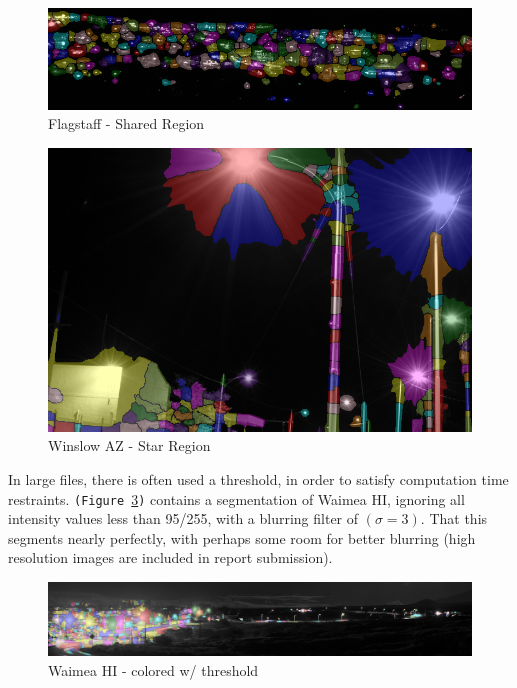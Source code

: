 \documentclass[11pt,twocolumn]{article} %
\begin{document}
\begin{figure}
  \includegraphics[width=\columnwidth]{./images/flagstaff-colored-160.png}
        \caption{Flagstaff - Shared Region}
        \label{fig:shared}
\end{figure}

\begin{figure}
  \includegraphics[width=\columnwidth]{./images/star.png}
        \caption{Winslow AZ - Star Region}
        \label{fig:star}
\end{figure}

In large files, there is often used a threshold, in order to satisfy computation time restraints. \texttt{(Figure~\ref{fig:wiama-colored})} contains a segmentation of Waimea HI, ignoring all intensity values less than 95/255, with a blurring filter of $(\sigma=3)$. That this segments nearly perfectly, with perhaps some room for better blurring (high resolution images are included in report submission).

\begin{figure}
  \includegraphics[width=\columnwidth]{./images/wiama-colored-160.png}
  \caption{Waimea HI - colored w/ threshold}
  \label{fig:wiama-colored}
\end{figure}
\end{document}
